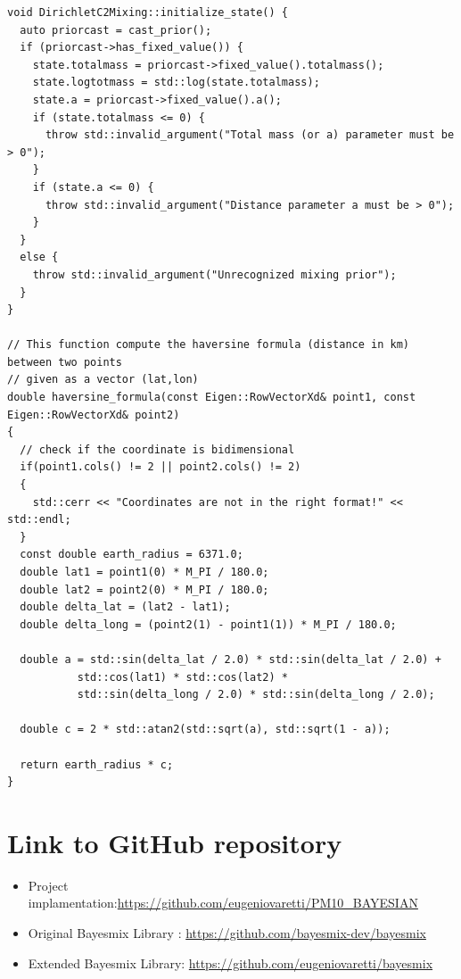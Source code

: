 \documentclass[12pt,a4paper]{article}
\begin{document}
\begin{lstlisting}
void DirichletC2Mixing::initialize_state() {
  auto priorcast = cast_prior();
  if (priorcast->has_fixed_value()) {
    state.totalmass = priorcast->fixed_value().totalmass();
    state.logtotmass = std::log(state.totalmass);
    state.a = priorcast->fixed_value().a();
    if (state.totalmass <= 0) {
      throw std::invalid_argument("Total mass (or a) parameter must be > 0");
    }
    if (state.a <= 0) {
      throw std::invalid_argument("Distance parameter a must be > 0");
    }
  }
  else {
    throw std::invalid_argument("Unrecognized mixing prior");
  }
}

// This function compute the haversine formula (distance in km) between two points
// given as a vector (lat,lon)
double haversine_formula(const Eigen::RowVectorXd& point1, const Eigen::RowVectorXd& point2)
{
  // check if the coordinate is bidimensional
  if(point1.cols() != 2 || point2.cols() != 2)
  {
    std::cerr << "Coordinates are not in the right format!" << std::endl;
  }
  const double earth_radius = 6371.0;
  double lat1 = point1(0) * M_PI / 180.0;
  double lat2 = point2(0) * M_PI / 180.0;
  double delta_lat = (lat2 - lat1);
  double delta_long = (point2(1) - point1(1)) * M_PI / 180.0;

  double a = std::sin(delta_lat / 2.0) * std::sin(delta_lat / 2.0) +
           std::cos(lat1) * std::cos(lat2) *
           std::sin(delta_long / 2.0) * std::sin(delta_long / 2.0);

  double c = 2 * std::atan2(std::sqrt(a), std::sqrt(1 - a));

  return earth_radius * c;
}

\end{lstlisting}

\newpage





\cite{Beraha2022BayesMixBM}
\cite{Page-Quintana}
\cite{BayesPPM}
\cite{Neal}
\cite{JournalofRoyalStat}
\cite{timeseriesbook}

\section*{Link to GitHub repository}

\begin{itemize}
\item Project implamentation:\href{https://github.com/eugeniovaretti/PM10_BAYESIAN}{https://github.com/eugeniovaretti/PM10\_BAYESIAN} 
\item Original Bayesmix Library \cite{Beraha2022BayesMixBM}: \href{https://github.com/bayesmix-dev/bayesmix}{https://github.com/bayesmix-dev/bayesmix}
\item Extended Bayesmix Library:
\href{https://github.com/eugeniovaretti/bayesmix}{https://github.com/eugeniovaretti/bayesmix}
\end{itemize}
\end{document}
